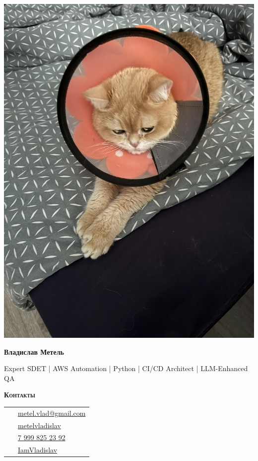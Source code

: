 \documentclass[10pt, a4paper]{article}
\newcommand{\headleft}[1]{\vspace*{2ex}\textsc{\textbf{#1}}\par%
	\vspace*{-1.5ex}\hrulefill\par\vspace*{0.7ex}}
\begin{document}
	
	\setlength{\topskip}{0pt}
	\setlength{\parindent}{0pt}
	\setlength{\parskip}{0pt}
	\setlength{\fboxsep}{0pt}
	\pagestyle{empty}
	\raggedbottom
	
	\begin{minipage}[t]{0.33\textwidth} %
		\colorbox{cvblue!90}{\color{white}  %
			\textwidth\relax%
			\begin{minipage}[t][297mm][t]{0.82\textwidth}
				\raggedright
				\vspace*{2ex} %
				\null\hfill\includegraphics[height=0.85\textwidth]{avatar.jpeg}\hfill\null

				
				\vspace*{1.5ex}
				
				\Large  \textbf{Владислав Метель} \normalsize 
				
				\vspace*{1.5ex}
				
				Expert SDET | AWS Automation | Python | CI/CD Architect | LLM-Enhanced QA
				
				\headleft{Контакты}
				
				\begin{tabular}{ @{}c l }
					\Letter\ & \href{mailto:metel.vlad@gmail.com?subject=Job Opportunity}{metel.vlad@gmail.com} \\
					\faLinkedin\ & \href{https://www.linkedin.com/in/metelvladislav}{metelvladislav} \\
					\faMobile*\ & \href{tel:+7 999 825 23 92}{\raisebox{0.2ex}{+}7 999 825 23 92} \\
					\faGithub\ & \href{https://github.com/IamVladislav}{IamVladislav} \\
				\end{tabular}
				

\end{minipage}}
\end{minipage}
\end{document}

